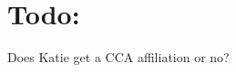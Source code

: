 \documentclass[twocolumn]{aastex631}
\begin{document}
\appendix
\section{Todo:}
Does Katie get a CCA affiliation or no?

{}

\end{document}
